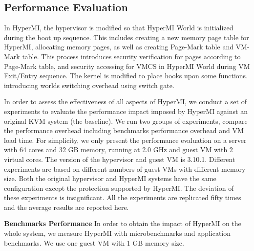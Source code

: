 \documentclass[conference]{IEEEtran}
\begin{document}
\subsection{Performance Evaluation}

In HyperMI, the hypervisor is modified so that HyperMI World is initialized during the boot up sequence. This includes creating a new memory page table for HyperMI, allocating memory pages, as well as creating Page-Mark table and VM-Mark table. This process introduces security verification for pages according to Page-Mark table, and security accessing for VMCS in HyperMI World during VM Exit/Entry sequence.
The kernel is modified to place hooks upon some functions.
introducing worlds switching overhead using switch gate.

In order to assess the effectiveness of all aspects of HyperMI, we conduct a set of experiments to evaluate the performance impact imposed by HyperMI against an original KVM system (the baseline). We run two groups of experiments, compare the performance overhead including benchmarks performance overhead and VM load time.
For simplicity, we only present the performance evaluation on a server with 64 cores and 32 GB memory, running at 2.0 GHz and guest VM with 2 virtual cores. The version of the hypervisor and guest VM is 3.10.1. Different experiments are based on different numbers of guest VMs with different memory size. Both the original hypervisor and HyperMI systems have the same configuration except the protection supported by HyperMI. The deviation of these experiments is insignificant. All the experiments are replicated fifty times and the average results are reported here.



\textbf{Benchmarks Performance}
In order to obtain the impact of HyperMI on the whole system, we measure HyperMI with microbenchmarks and application benchmarks. 
We use one guest VM with 1 GB memory size. 
\end{document}
